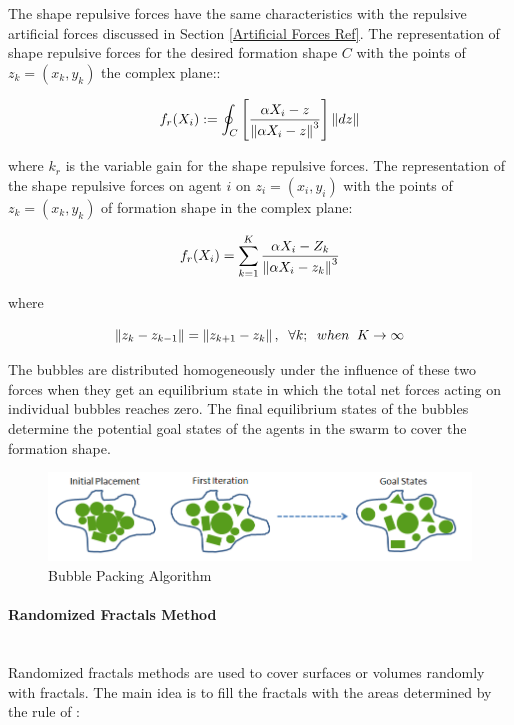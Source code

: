 The shape repulsive forces have the same characteristics with the repulsive artificial forces discussed in Section \ref{Artificial Forces Ref}. The representation of shape repulsive forces for the desired formation shape $C$ with the points of  $z_k = (x_k,y_k)$ the complex plane::
	
\begin{equation}
f_r(X_i) := \oint_C \left[\frac{\alpha X_i - z}{\left\lVert\alpha X_i - z\right\rVert^3}\right] \left\lVert dz\right\rVert
\end{equation}

where $k_r$ is the variable gain for the shape repulsive forces. The representation of the shape repulsive forces on agent $i$ on $z_i = (x_i, y_i)$ with the points of  $z_k = (x_k,y_k)$ of formation shape in the complex plane:

\begin{equation}
f_r(X_i) = \sum_{k=1}^{K} \frac{\alpha X_i - Z_k}{\left\lVert\alpha X_i - z_k\right\rVert^3}
\end{equation}
				
where

\begin{equation}
\left\lVert z_k - z_{k-1}\right\rVert = \left\lVert z_{k+1} - z_k\right\rVert, \hspace{0.2cm}  \forall k ;  \hspace{0.2cm} when  \hspace{0.2cm} K \to\infty
\end{equation}
						

	
The bubbles are distributed homogeneously under the influence of these two forces when they get an equilibrium state in which the total net forces acting on individual bubbles reaches zero. The final equilibrium states of the bubbles determine the potential goal states of the agents in the swarm to cover the formation shape. 

\begin{figure}[H]
\caption{Bubble Packing Algorithm}
\centering
\includegraphics[scale = 0.62]{bubble_packing2}
\end{figure}

\paragraph{Randomized Fractals Method}\hspace{0pt} \\
Randomized fractals methods are used to cover surfaces or volumes randomly with fractals. The main idea is to fill the fractals with the areas determined by the rule of \cite{26} :

